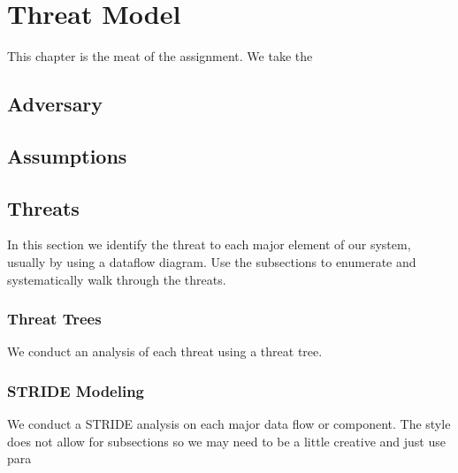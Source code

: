 \chapter{Threat Model}
\label{ch:threatmodel}
This chapter is the meat of the assignment.  We take the


\section{Adversary}
\label{sec:adversary}

\section{Assumptions}
\label{sec:assumptions}

\section{Threats}
\label{sec:threats}
In this section we identify the threat to each major element of our
system, usually by using a dataflow diagram.  Use the subsections to
enumerate and systematically walk through the threats.
\subsection{Threat Trees}
We conduct an analysis of each threat using a threat tree.

\subsection{STRIDE Modeling}
We conduct a STRIDE analysis on each major data flow or component.
The style does not allow for subsections so we may need to be a little
creative and just use para

